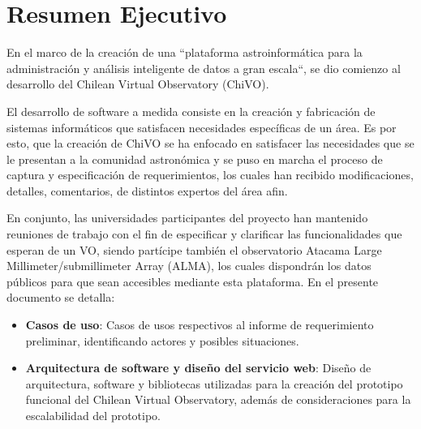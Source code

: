 \section{Resumen Ejecutivo}

En el marco de la creación de una ``plataforma
astroinformática para la administración y análisis inteligente de datos a gran
escala``, se dio comienzo al desarrollo del Chilean Virtual Observatory (ChiVO).

El desarrollo de software a medida consiste en la creación y fabricación de
sistemas informáticos que satisfacen necesidades específicas de un área. Es por
esto, que la creación de ChiVO se ha enfocado en satisfacer las necesidades que
se le presentan a la comunidad astronómica y se puso en marcha el proceso de
captura y especificación de requerimientos, los cuales han recibido
modificaciones, detalles, comentarios, de distintos expertos del área afin.

En conjunto, las universidades participantes del proyecto han mantenido
reuniones de trabajo con el fin de especificar y clarificar las funcionalidades
que esperan de un VO, siendo partícipe también el observatorio Atacama Large
Millimeter/submillimeter Array (ALMA), los cuales dispondrán los datos públicos
para que sean accesibles mediante esta plataforma. En el presente documento se
detalla:
\begin{itemize}
	\item \textbf{Casos de uso}: Casos de usos respectivos al informe de
requerimiento preliminar, identificando actores y posibles situaciones.
	\item \textbf{Arquitectura de software y diseño del servicio web}: Diseño
de arquitectura, software y bibliotecas utilizadas para la creación del
prototipo funcional del Chilean Virtual Observatory, además de consideraciones
para la escalabilidad del prototipo.
\end{itemize}

